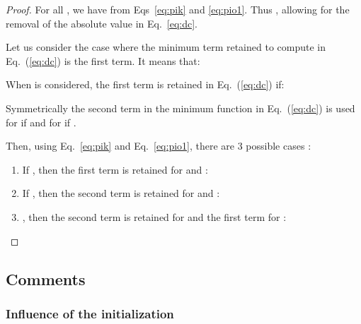 \documentclass{scrartcl}
\theoremstyle{plain}
\begin{document}
\begin{proof}
For all , we have  from Eqs~\ref{eq:pik} and \ref{eq:pio1}. Thus , allowing for the removal of the absolute value in 
Eq.~\ref{eq:dc}.

Let us consider the case where the minimum term retained to compute 
 in Eq.~(\ref{eq:dc}) is the first term. It means that:



When  is considered, the first term is retained in 
Eq.~(\ref{eq:dc}) if:



Symmetrically the second term in the minimum function in Eq.~(\ref{eq:dc}) is 
used for  if  and for 
 if . 

Then, using Eq.~\ref{eq:pik} and Eq.~\ref{eq:pio1}, there are 3 possible cases :

\begin{enumerate}
\item  If , then the first term is retained for 
 and :
  
  
\item If , then the second term is retained for 
 and :



\item , then the second term is 
retained for  and the first term for :



\end{enumerate}

\end{proof}


\subsection{Comments}

\subsubsection{Influence of the initialization}
\end{document}
